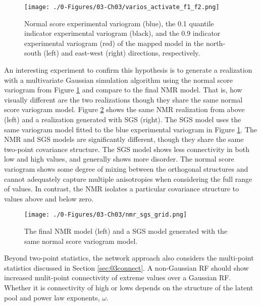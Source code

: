 \begin{figure}[htb!]
    \centering
    \texttt{[image: ./0-Figures/03-Ch03/varios\_activate\_f1\_f2.png]}
    \caption{Normal score experimental variogram (blue), the 0.1 quantile indicator experimental variogram (black), and the 0.9 indicator experimental variogram (red) of the mapped model in the north-south (left) and east-west (right) directions, respectively.}
    \label{fig:varios_activate_f1_f2}
\end{figure}

An interesting experiment to confirm this hypothesis is to generate a realization with a multivariate Gaussian simulation algorithm using the normal score variogram from Figure \ref{fig:varios_activate_f1_f2} and compare to the final \gls{NMR} model. That is, how visually different are the two realizations though they share the same normal score variogram model. Figure \ref{fig:nmr_sgs_grid} shows the same \gls{NMR} realization from above (left) and a realization generated with \gls{SGS} (right). The \gls{SGS} model uses the same variogram model fitted to the blue experimental variogram in Figure \ref{fig:varios_activate_f1_f2}. The \gls{NMR} and \gls{SGS} models are significantly different, though they share the same two-point covariance structure. The \gls{SGS} model shows less connectivity in both low and high values, and generally shows more disorder. The normal score variogram shows some degree of mixing between the orthogonal structures and cannot adequately capture multiple anisotropies when considering the full range of values. In contrast, the \gls{NMR} isolates a particular covariance structure to values above and below zero.

\begin{figure}[htb!]
    \centering
    \texttt{[image: ./0-Figures/03-Ch03/nmr\_sgs\_grid.png]}
    \caption{ The final \gls{NMR} model (left) and a \gls{SGS} model generated with the same normal score variogram model. }
    \label{fig:nmr_sgs_grid}
\end{figure}

Beyond two-point statistics, the network approach also considers the multi-point statistics discussed in Section \ref{sec:03connect}. A non-Gaussian \gls{RF} should show increased mulit-point connectivity of extreme values over a Gaussian \gls{RF}. Whether it is connectivity of high or lows depends on the structure of the latent pool and power law exponents, $\omega$.


